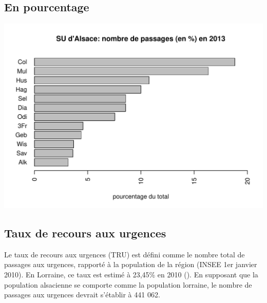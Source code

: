 \documentclass[12pt,english,french,twoside]{book}\usepackage[]{graphicx}\usepackage[]{color}
\makeatletter
\def\maxwidth{ %
  \ifdim\Gin@nat@width>\linewidth
    \linewidth
  \else
    \Gin@nat@width
  \fi
}
\newenvironment{knitrout}{}{} %
\makeatother
\begin{document}
\subsection*{En pourcentage}




\begin{center}
\begin{knitrout}
\color{fgcolor}
\includegraphics[width=\maxwidth]{figure/bp_en_pourcentage} 

\end{knitrout}

\label{fig:bp_en_pourcentage}
\end{center}

\subsection*{Taux de recours aux urgences}



Le taux de recours aux urgences  (TRU)  est défini comme le nombre total de passages aux urgences, rapporté à la population de la région (INSEE 1er janvier 2010). En Lorraine, ce taux est estimé à 23,45\% en 2010 (\cite{2,3}). En supposant que la population alsacienne se comporte comme la population lorraine, le nombre de passages aux urgences devrait s'établir à 441 062.
\end{document}
